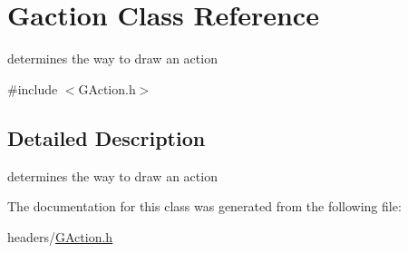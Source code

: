 \hypertarget{class_gaction}{\section{\-Gaction \-Class \-Reference}
\label{class_gaction}
}


determines the way to draw an action  




{\ttfamily \#include $<$\-G\-Action.\-h$>$}



\subsection{\-Detailed \-Description}
determines the way to draw an action 

\-The documentation for this class was generated from the following file\-:\begin{DoxyCompactItemize}
\item 
headers/\hyperlink{_g_action_8h}{\-G\-Action.\-h}\end{DoxyCompactItemize}
